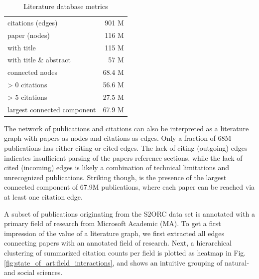 \begin{table}[ht]
	\centering
	\caption[Literature Graph Metrics]{Literature database metrics}
	\label{tab:state_of_art:graph}
	\begin{tabular}{l|r}
		\hline
		citations (edges)           & 901 M 	\\
		paper (nodes)               & 116 M 	\\ \hline
		with title					& 115 M		\\
		with title \& abstract		&  57 M		\\ \hline
		connected nodes             &  68.4 M 	\\
		> 0 citations				&  56.6 M	\\
		> 5 citations				&  27.5 M	\\
		largest connected component &  67.9 M 	\\ \hline
	\end{tabular}
\end{table}

The network of publications and citations can also be interpreted as a literature graph with papers as nodes and citations as edges.
Only a fraction of 68M publications has either citing or cited edges.
The lack of citing (outgoing) edges indicates insufficient parsing of the papers reference sections, while the lack of cited (incoming) edges is likely a combination of technical limitations and unrecognized publications.
Striking though, is the presence of the largest connected component of 67.9M publications, where each paper can be reached via at least one citation edge.

A subset of publications originating from the S2ORC data set is annotated with a primary field of research from Microsoft Academic (MA). 
To get a first impression of the value of a literature graph, we first extracted all edges connecting papers with an annotated field of research.
Next, a hierarchical clustering of summarized citation counts per field is plotted as heatmap in Fig. \ref{fig:state_of_art:field_interactions}, and shows an intuitive grouping of natural- and social sciences.

